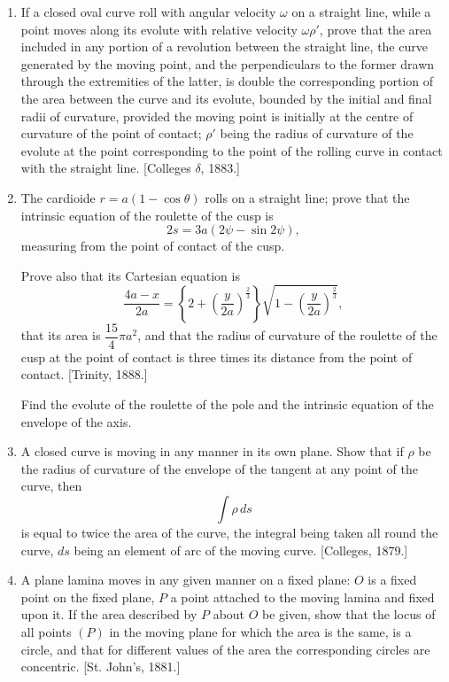 \documentclass[11pt, a4paper]{article}
\newcommand{\source}[1]{\hfill\textnormal{[#1]}}
\begin{document}
\begin{enumerate}[leftmargin=2em]
\item If a closed oval curve roll with angular velocity $\omega$ on a straight line, while a point moves along its evolute with relative velocity $\omega\rho'$, prove that the area included in any portion of a revolution between the straight line, the curve generated by the moving point, and the perpendiculars to the former drawn through the extremities of the latter, is double the corresponding portion of the area between the curve and its evolute, bounded by the initial and final radii of curvature, provided the moving point is initially at the centre of curvature of the point of contact; $\rho'$ being the radius of curvature of the evolute at the point corresponding to the point of the rolling curve in contact with the straight line. \source{Colleges $\delta$, 1883.}

\item The cardioide $r=a(1-\cos\theta)$ rolls on a straight line; prove that the intrinsic equation of the roulette of the cusp is
\[
2s=3a(2\psi-\sin2\psi),
\]
measuring from the point of contact of the cusp.

Prove also that its Cartesian equation is
\[
\frac{4a-x}{2a}=\left\{2+\left(\frac{y}{2a}\right)^{\frac23}\right\}\sqrt{1-\left(\frac{y}{2a}\right)^{\frac23}},
\]
that its area is $\dfrac{15}{4}\pi a^2$, and that the radius of curvature of the roulette of the cusp at the point of contact is three times its distance from the point of contact. \source{Trinity, 1888.}

Find the evolute of the roulette of the pole and the intrinsic equation of the envelope of the axis.

\item A closed curve is moving in any manner in its own plane. Show that if $\rho$ be the radius of curvature of the envelope of the tangent at any point of the curve, then
\[
\int\rho\,ds
\]
is equal to twice the area of the curve, the integral being taken all round the curve, $ds$ being an element of arc of the moving curve. \source{Colleges, 1879.}

\item A plane lamina moves in any given manner on a fixed plane: $O$ is a fixed point on the fixed plane, $P$ a point attached to the moving lamina and fixed upon it. If the area described by $P$ about $O$ be given, show that the locus of all points $(P)$ in the moving plane for which the area is the same, is a circle, and that for different values of the area the corresponding circles are concentric. \source{St. John's, 1881.}


\end{enumerate}
\end{document}
